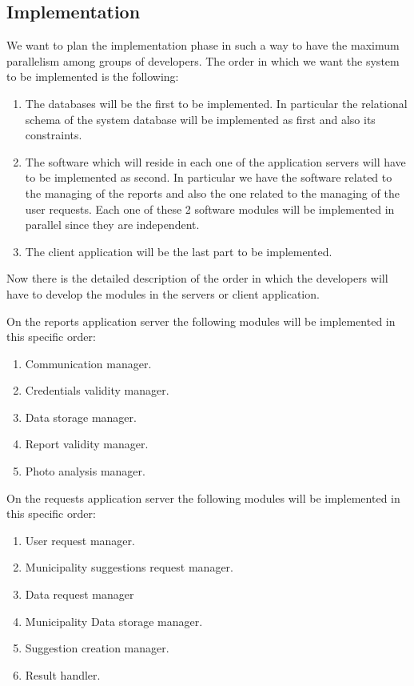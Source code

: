 \documentclass[titlepage]{article}
\begin{document}
\subsection{Implementation}
We want to plan the implementation phase in such a way to have the maximum parallelism among groups of developers.
The order in which we want the system to be implemented is the following:

\begin{enumerate}

	\item The databases will be the first to be implemented. In particular the relational schema of the system database will be implemented as first and also its constraints.
	\item The software which will reside in each one of the application servers will have to be implemented as second. In particular we have the software related to the managing of the reports and also the one related to the managing of the user requests. Each one of these 2 software modules will be implemented in parallel since they are independent.
	\item The client application will be the last part to be implemented.\\
		
\end{enumerate}
Now there is the detailed description of the order in which the developers will have to develop the modules in the servers or client application.
	
On the reports application server the following modules will be implemented in this specific order:

\begin{enumerate}
	\item Communication manager.
	\item Credentials validity manager.
	\item Data storage manager.
	\item Report validity manager.
	\item Photo analysis manager.\\
\end{enumerate}


On the requests application server the following modules will be implemented in this specific order:

\begin{enumerate}
	\item User request manager.
	\item Municipality suggestions request manager.
	\item Data request manager
	\item Municipality Data storage manager.
	\item Suggestion creation manager.
	\item Result handler.\\
\end{enumerate}
\end{document}
